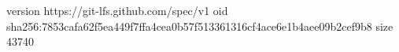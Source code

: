 version https://git-lfs.github.com/spec/v1
oid sha256:7853cafa62f5ea449f7ffa4cea0b57f513361316cf4ace6e1b4aee09b2cef9b8
size 43740
